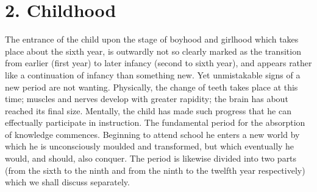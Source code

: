 \section{2. Childhood}

The entrance of the child upon the stage of boyhood and girlhood which takes place about the sixth year, is outwardly not so clearly marked as the transition from earlier (first year) to later infancy (second to sixth year), and appears rather like a continuation of infancy than something new. Yet unmistakable signs of a new period are not wanting. Physically, the change of teeth takes place at this time; muscles and nerves develop with greater rapidity; the brain has about reached its final size. Mentally, the child has made such progress that he can effectually participate in instruction. The fundamental period for the absorption of knowledge commences. Beginning to attend school he enters a new world by which he is unconsciously moulded and transformed, but which eventually he would, and should, also conquer. The period is likewise divided into two parts (from the sixth to the ninth and from the ninth to the twelfth year respectively) which we shall discuss separately.


